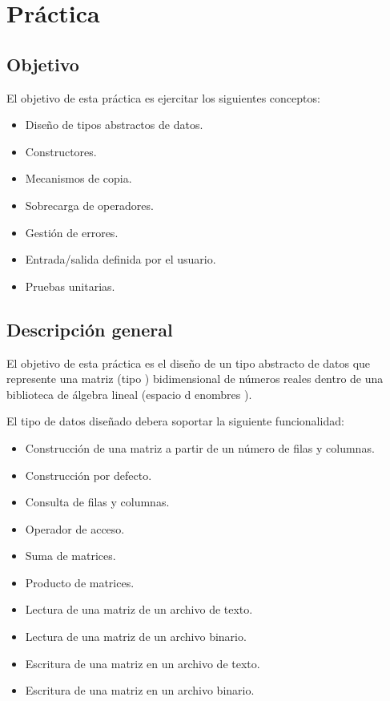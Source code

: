 \section{Práctica}

\subsection{Objetivo}

El objetivo de esta práctica es ejercitar los siguientes conceptos:

\begin{itemize}

\item Diseño de tipos abstractos de datos.
\item Constructores.
\item Mecanismos de copia.
\item Sobrecarga de operadores.
\item Gestión de errores.
\item Entrada/salida definida por el usuario.
\item Pruebas unitarias.

\end{itemize}

\subsection{Descripción general}

El objetivo de esta práctica es el diseño de un tipo abstracto de datos que
represente una matriz (tipo ) bidimensional de números reales
dentro de una biblioteca de álgebra lineal (espacio d enombres ).

El tipo de datos diseñado debera soportar la siguiente funcionalidad:

\begin{itemize}
  \item Construcción de una matriz a partir de un número de filas y columnas.
  \item Construcción por defecto.
  \item Consulta de filas y columnas.
  \item Operador de acceso.
  \item Suma de matrices.
  \item Producto de matrices.
  \item Lectura de una matriz de un archivo de texto.
  \item Lectura de una matriz de un archivo binario.
  \item Escritura de una matriz en un archivo de texto.
  \item Escritura de una matriz en un archivo binario.
\end{itemize}

